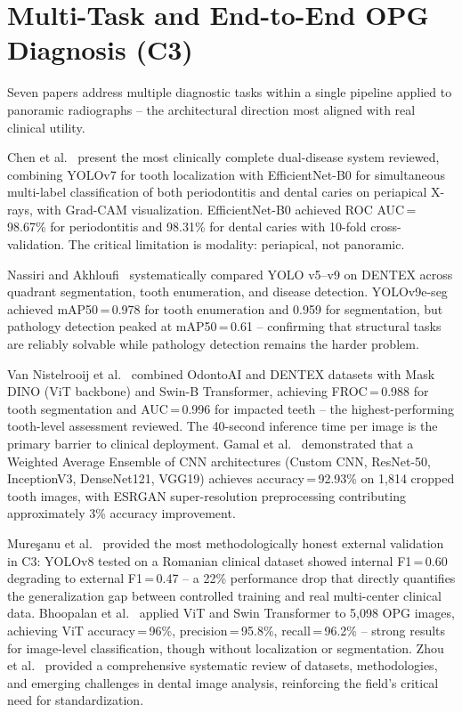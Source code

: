 \documentclass[conference]{IEEEtran}
\begin{document}
\section{Multi-Task and End-to-End OPG Diagnosis (C3)}
\label{sec:multitask}

Seven papers address multiple diagnostic tasks within a single pipeline
applied to panoramic radiographs -- the architectural direction most
aligned with real clinical utility.

Chen et al.~\cite{chen2023deep} present the most clinically complete
dual-disease system reviewed, combining YOLOv7 for tooth localization
with EfficientNet-B0 for simultaneous multi-label classification of both
periodontitis and dental caries on periapical X-rays, with Grad-CAM
visualization. EfficientNet-B0 achieved ROC AUC\,=\,98.67\% for
periodontitis and 98.31\% for dental caries with 10-fold
cross-validation. The critical limitation is modality: periapical, not
panoramic.

Nassiri and Akhloufi~\cite{nassiri2025yolo} systematically compared YOLO
v5--v9 on DENTEX across quadrant segmentation, tooth enumeration, and
disease detection. YOLOv9e-seg achieved mAP50\,=\,0.978 for tooth
enumeration and 0.959 for segmentation, but pathology detection peaked
at mAP50\,=\,0.61 -- confirming that structural tasks are reliably
solvable while pathology detection remains the harder problem.

Van Nistelrooij et al.~\cite{vannistelrooij2024combining} combined
OdontoAI and DENTEX datasets with Mask DINO (ViT backbone) and Swin-B
Transformer, achieving FROC\,=\,0.988 for tooth segmentation and
AUC\,=\,0.996 for impacted teeth -- the highest-performing tooth-level
assessment reviewed. The 40-second inference time per image is the
primary barrier to clinical deployment. Gamal et
al.~\cite{gamal2025automated} demonstrated that a Weighted Average
Ensemble of CNN architectures (Custom CNN, ResNet-50, InceptionV3,
DenseNet121, VGG19) achieves accuracy\,=\,92.93\% on 1,814 cropped
tooth images, with ESRGAN super-resolution preprocessing contributing
approximately 3\% accuracy improvement.

Mure\c{s}anu et al.~\cite{muresanu2024automating} provided the most
methodologically honest external validation in C3: YOLOv8 tested on a
Romanian clinical dataset showed internal F1\,=\,0.60 degrading to
external F1\,=\,0.47 -- a 22\% performance drop that directly quantifies
the generalization gap between controlled training and real multi-center
clinical data. Bhoopalan et al.~\cite{bhoopalan2026self} applied ViT and
Swin Transformer to 5,098 OPG images, achieving ViT accuracy\,=\,96\%,
precision\,=\,95.8\%, recall\,=\,96.2\% -- strong results for
image-level classification, though without localization or segmentation.
Zhou et al.~\cite{zhou2025deep} provided a comprehensive systematic
review of datasets, methodologies, and emerging challenges in dental
image analysis, reinforcing the field's critical need for standardization.
\end{document}
